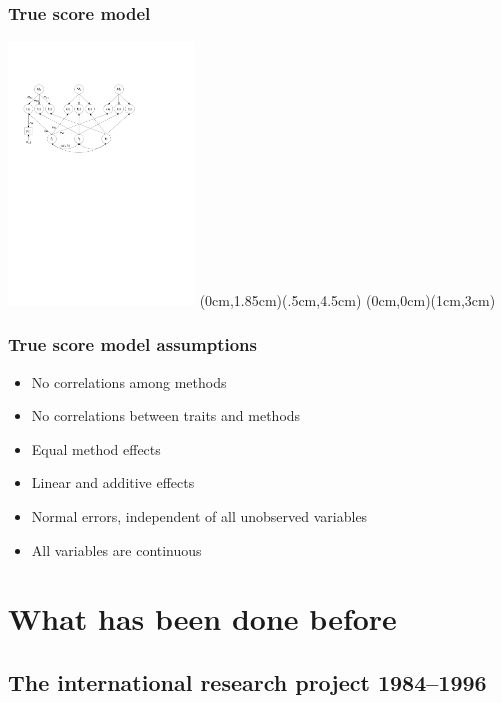 \documentclass{beamer}
\begin{document}
\begin{frame}	
	\frametitle{\hypertarget{model}{True score model}}
	\includegraphics[height=7cm]{i/MTMM.pdf}
	(0cm,1.85cm)(.5cm,4.5cm)
	(0cm,0cm)(1cm,3cm)
\end{frame}	

\begin{frame}	
	\frametitle{True score model assumptions}
	\begin{itemize}[<alert@+>]
		\item No correlations among methods
		\item No correlations between traits and methods
		\item Equal method effects
		\item Linear and additive effects
		\item Normal errors, independent of all unobserved variables
		\item All variables are continuous
	\end{itemize}
\end{frame}	


\section{What has been done before}

\subsection{The international research project 1984--1996}
\end{document}
